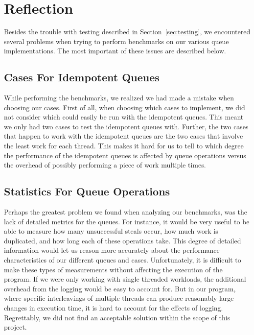\section{Reflection}
\label{sec:Reflection}
Besides the trouble with testing described in Section~\ref{sec:testing}, we
encountered several problems when trying to perform benchmarks on our various
queue implementations. The most important of these issues are described below.
 
\subsection{Cases For Idempotent Queues}
\label{sub:cases_for_idempotent_queues}
While performing the benchmarks, we realized we had made a mistake when
choosing our cases. First of all, when choosing which cases to implement, we
did not consider which could easily be run with the idempotent queues. This
meant we only had two cases to test the idempotent queues with. Further, the
two cases that happen to work with the idempotent queues are the two cases
that involve the least work for each thread. This makes it hard for us to tell
to which degree the performance of the idempotent queues is affected by queue
operations versus the overhead of possibly performing a piece of work multiple
times.

\subsection{Statistics For Queue Operations}
\label{sub:statistic_for_queue_operations}
Perhaps the greatest problem we found when analyzing our benchmarks, was the lack
of detailed metrics for the queues. For instance, it would be very useful to be
able to measure how many unsuccessful steals occur, how much work is duplicated, and how long each of these
operations take. This degree of detailed information would let us reason more
accurately about the performance characteristics of our different queues and
cases. Unfortunately, it is difficult to make these types of measurements
without affecting the execution of the program. If we were only working with
single threaded workloads, the additional overhead from the logging would be
easy to account for. But in our program, where specific interleavings of
multiple threads can produce reasonably large changes in execution time, it is
hard to account for the effects of logging. Regrettably, we did not find an
acceptable solution within the scope of this project.

